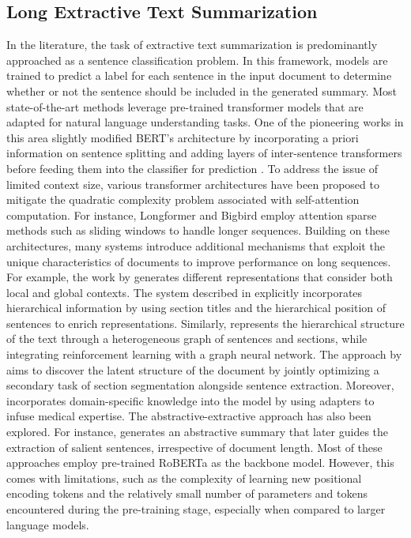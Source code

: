 \subsection{Long Extractive Text Summarization}

In the literature, the task of extractive text summarization is predominantly approached as a sentence classification problem. In this framework, models are trained to predict a label for each sentence in the input document to determine whether or not the sentence should be included in the generated summary. Most state-of-the-art methods leverage pre-trained transformer models that are adapted for natural language understanding tasks. One of the pioneering works in this area slightly modified BERT's architecture by incorporating a priori information on sentence splitting and adding layers of inter-sentence transformers before feeding them into the classifier for prediction \cite{liu-lapata-2019-text}. To address the issue of limited context size, various transformer architectures have been proposed to mitigate the quadratic complexity problem associated with self-attention computation. For instance, Longformer \cite{beltagy2020longformer} and Bigbird \cite{Zaheer2020bigbird} employ attention sparse methods such as sliding windows to handle longer sequences. Building on these architectures, many systems introduce additional mechanisms that exploit the unique characteristics of documents to improve performance on long sequences. For example, the work by \cite{xiao-carenini-2019-extractive} generates different representations that consider both local and global contexts. The system described in \cite{ruan-etal-2022-histruct} explicitly incorporates hierarchical information by using section titles and the hierarchical position of sentences to enrich representations. Similarly, \cite{bian2023gosum} represents the hierarchical structure of the text through a heterogeneous graph of sentences and sections, while integrating reinforcement learning with a graph neural network. The approach by \cite{cho-etal-2022-toward} aims to discover the latent structure of the document by jointly optimizing a secondary task of section segmentation alongside sentence extraction. Moreover, \cite{xie2022pre} incorporates domain-specific knowledge into the model by using adapters to infuse medical expertise. The abstractive-extractive approach has also been explored. For instance, \cite{bishop2022gencomparesum} generates an abstractive summary that later guides the extraction of salient sentences, irrespective of document length. Most of these approaches employ pre-trained RoBERTa \cite{DBLProberta} as the backbone model. However, this comes with limitations, such as the complexity of learning new positional encoding tokens and the relatively small number of parameters and tokens encountered during the pre-training stage, especially when compared to larger language models.

